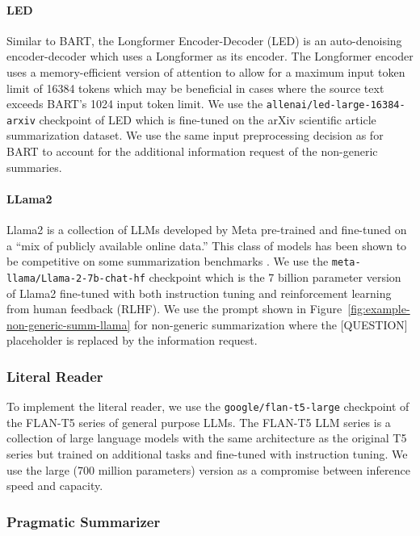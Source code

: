 \documentclass[11pt]{article}
\begin{document}
\paragraph{LED} Similar to BART, the Longformer Encoder-Decoder \citep{longformer_conditional} (LED) is an auto-denoising encoder-decoder which uses a Longformer as its encoder. The Longformer encoder uses a memory-efficient version of attention to allow for a maximum input token limit of 16384 tokens which may be beneficial in cases where the source text exceeds BART's 1024 input token limit. We use the \texttt{allenai/led-large-16384-arxiv} checkpoint of LED which is fine-tuned on the arXiv scientific article summarization dataset. We use the same input preprocessing decision as for BART to account for the additional information request of the non-generic summaries. 

\paragraph{LLama2} Llama2 \citep{touvronLlamaOpenFoundation2023} is a collection of LLMs developed by Meta pre-trained and fine-tuned on a ``mix of publicly available online data.'' This class of models has been shown to be competitive on some summarization benchmarks \citep{yangExploringLimitsChatGPT2023,zhangBenchmarkingLargeLanguage2024}. We use the \texttt{meta-llama/Llama-2-7b-chat-hf} checkpoint which is the 7 billion parameter version of Llama2 fine-tuned with both instruction tuning and reinforcement learning from human feedback (RLHF). We use the prompt shown in Figure~\ref{fig:example-non-generic-summ-llama} for non-generic summarization where the [QUESTION] placeholder is replaced by the information request.

\subsubsection{Literal Reader}

To implement the literal reader, we use the \texttt{google/flan-t5-large} checkpoint of the FLAN-T5 \citep{chung2022scaling} series of general purpose LLMs. The FLAN-T5 LLM series is a collection of large language models with the same architecture as the original T5 series but trained on additional tasks and fine-tuned with instruction tuning. We use the large (700 million parameters) version as a compromise between inference speed and capacity.

\subsubsection{Pragmatic Summarizer}
\end{document}
